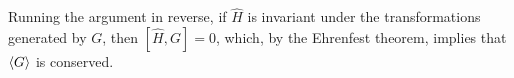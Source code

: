     
    Running the argument in reverse, if $\hat{H}$ is invariant under the transformations generated by $G$, then $[\hat{H},G]=0$, which, by the Ehrenfest theorem, implies that $\braket{G}$ is conserved.